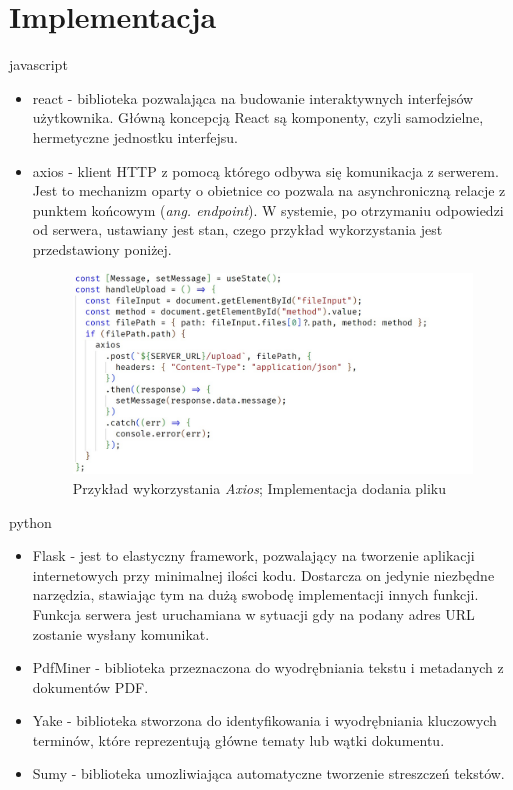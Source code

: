 \documentclass[12pt,a4paper,twoside]{article}
\begin{document}
\section{Implementacja}
javascript
\begin{itemize}
	\item react - biblioteka pozwalająca na budowanie interaktywnych interfejsów użytkownika. Główną koncepcją React są komponenty, czyli samodzielne, hermetyczne jednostku interfejsu.
	\item axios - klient HTTP z pomocą którego odbywa się komunikacja z serwerem. Jest to mechanizm oparty o obietnice co pozwala na asynchroniczną relacje z punktem końcowym (\textit{ang. endpoint}). W systemie, po otrzymaniu odpowiedzi od serwera, ustawiany jest stan, czego przykład wykorzystania jest przedstawiony poniżej.
\begin{figure}[h!]
\centering
\includegraphics[width=\textwidth]{img/axios.jpg}
\caption{Przykład wykorzystania \textit{Axios}; Implementacja dodania pliku}
\end{figure}
\end{itemize}
python
\begin{itemize}
	\item Flask - jest to elastyczny framework, pozwalający na tworzenie aplikacji internetowych przy minimalnej ilości kodu. Dostarcza on jedynie niezbędne narzędzia, stawiając tym na dużą swobodę implementacji innych funkcji. Funkcja serwera jest uruchamiana w sytuacji gdy na podany adres URL zostanie wysłany komunikat.
	\item PdfMiner - biblioteka przeznaczona do wyodrębniania tekstu i metadanych z dokumentów PDF. 
	\item Yake - biblioteka stworzona do identyfikowania i wyodrębniania kluczowych terminów, które reprezentują główne tematy lub wątki dokumentu.
	\item Sumy - biblioteka umozliwiająca automatyczne tworzenie streszczeń tekstów.
\end{itemize}
\end{document}
